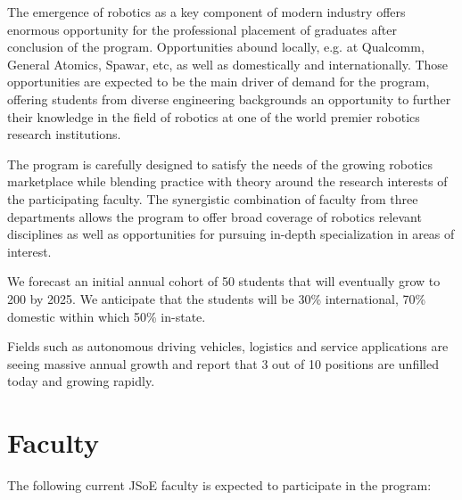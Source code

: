 \documentclass[11pt,letterpaper]{article}
\begin{document}
The emergence of robotics as a key component of modern industry offers
enormous opportunity for the professional placement of graduates after
conclusion of the program. Opportunities abound locally, e.g. at
Qualcomm, General Atomics, Spawar, etc, as well as domestically and
internationally. Those opportunities are expected to be the main
driver of demand for the program, offering students from diverse
engineering backgrounds an opportunity to further their knowledge in
the field of robotics at one of the world premier robotics
research institutions.

The program is carefully designed to satisfy the needs of the growing
robotics marketplace while blending practice with theory around the
research interests of the participating faculty. The synergistic
combination of faculty from three departments allows the program to
offer broad coverage of robotics relevant disciplines as well as
opportunities for pursuing in-depth specialization in areas of
interest.

We forecast an initial annual cohort of 50 students that will
eventually grow to 200 by 2025. We anticipate that the students will be
30\% international, 70\% domestic within which 50\% in-state.

Fields such as autonomous driving vehicles, logistics and service
applications are seeing massive annual growth and report that 3 out of
10 positions are unfilled today and growing rapidly.

\section{Faculty}

The following current JSoE faculty is expected to participate in the
program:
\end{document}
